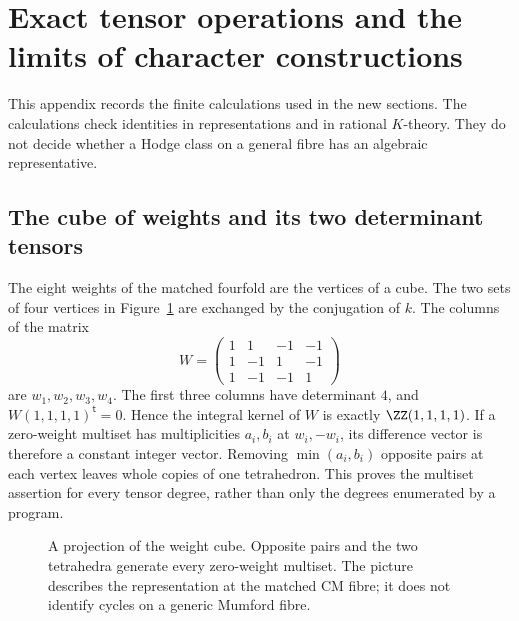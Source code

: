 \section{Exact tensor operations and the limits of character constructions}
\label{v7:app:derivations}

This appendix records the finite calculations used in the new sections.
The calculations check identities in representations and in rational
$K$-theory. They do not decide whether a Hodge class on a general fibre
has an algebraic representative.

\subsection{The cube of weights and its two determinant tensors}

The eight weights of the matched fourfold are the vertices of a cube.
The two sets of four vertices in Figure~\ref{v7:fig:cube} are exchanged
by the conjugation of $k$. The columns of the matrix
\[
 W=\begin{pmatrix}
 1&1&-1&-1\\1&-1&1&-1\\1&-1&-1&1
 \end{pmatrix}
\]
are $w_1,w_2,w_3,w_4$. The first three columns have determinant $4$,
and $W(1,1,1,1)^{\mathsf t}=0$. Hence the integral kernel of $W$ is
exactly $\ZZ(1,1,1,1)$. If a zero-weight multiset has multiplicities
$a_i,b_i$ at $w_i,-w_i$, its difference vector is therefore a constant
integer vector. Removing $\min(a_i,b_i)$ opposite pairs at each vertex
leaves whole copies of one tetrahedron. This proves the multiset
assertion for every tensor degree, rather than only the degrees
enumerated by a program.

\begin{figure}[htbp]
\centering
{}
\caption{A projection of the weight cube. Opposite pairs and the two
tetrahedra generate every zero-weight multiset. The picture describes
the representation at the matched CM fibre; it does not identify
cycles on a generic Mumford fibre.}\label{v7:fig:cube}
\end{figure}

